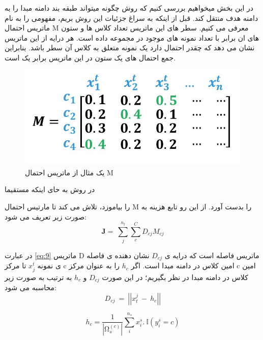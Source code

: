 {\subsubsection{ }
در این بخش میخواهیم بررسی کنیم که روش 
چگونه میتواند طبقه بند دامنه مبدا را به دامنه هدف منتقل کند. قبل از اینکه به سراغ جزئیات این روش بریم، مفهومی را به نام ماتریس احتمال M معرفی می کنیم. سطر های این ماتریس تعداد کلاس ها و ستون های ان برابر با تعداد نمونه های موجود در مجموعه داده است. هر درایه از این ماتریس نشان می دهد که چقدر احتمال دارد یک نمونه متعلق به کلاس آن سطر باشد. بنابراین جمع احتمال های یک ستون در این ماتریس برابر یک است.
\begin{figure}[h]
	\centering
	\includegraphics[scale=0.3]{images/annotation.JPG}
	\caption{یک مثال از ماتریس احتمال M}
	\label{fig:7}
\end{figure}

در روش 
به حای اینکه مستقیما 

را بیاموزد، تلاش می کند تا مارتیس احتمال M را بدست آورد. از این رو تابع هزینه به صورت زیر تعریف می شود:
\begin{equation}
\mathbf{J}=\ \sum_{j}^{n_t}\sum_{c}^{C}{D_{cj}}M_{cj}
\label{eq:9}
\end{equation}

در عبارت 
\ref{eq:9}
ماتریس D ماتریس فاصله است که درایه ی 
$D_{cj}$
نشان دهنده ی فاصله ی نمونه
$x_j^t$
تا مرکز c امین کلاس در دامنه مبدا است. اگر 
$h_c$
را به عنوان مرکز c امین کلاس در دامنه مبدا در نظر بگیریم؛ در این صورت 
$D_{cj}$
و 
$h_c$
به ترتیب به صورت زیر محاسبه می شود:
\begin{equation}
D_{cj}\ =\ \left|\left|x_t^j\ -\ h_c\right|\right|
\label{eq:10}
\end{equation}

\begin{equation}
h_c=\frac{1}{\left|\mathrm{\Omega}_s^{\left(c\right)}\right|}\sum_{i}^{n_s}{x_i^s.\ \mathbb{I}\left(y_i^s=c\right)}
\label{eq:11}
\end{equation}

}
